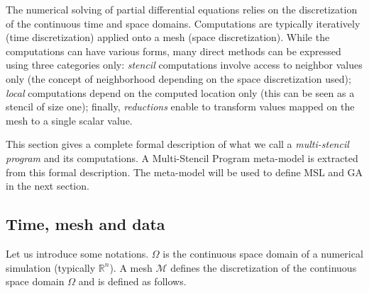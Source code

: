 
The numerical solving of partial differential equations relies on the discretization of the continuous time and space domains.
Computations are typically iteratively (time discretization) applied onto a mesh (space discretization).
While the computations can have various forms, many direct methods can be expressed using three categories only:
\emph{stencil} computations involve access to neighbor values only (the concept of neighborhood depending on the space discretization used);
\emph{local} computations depend on the computed location only (this can be seen as a stencil of size one);
finally, \emph{reductions} enable to transform values mapped on the mesh to a single scalar value.

This section gives a complete formal description of what we call a \textit{multi-stencil program} and its computations. A Multi-Stencil Program meta-model is extracted from this formal description. The meta-model will be used to define MSL and GA in the next section.

\subsection{Time, mesh and data}

Let us introduce some notations.
$\Omega$ is the continuous space domain of a numerical simulation (typically $\mathbb{R}^n$). %
A mesh $\mathcal{M}$ defines the discretization of the continuous space domain $\Omega$ and is defined as follows.


